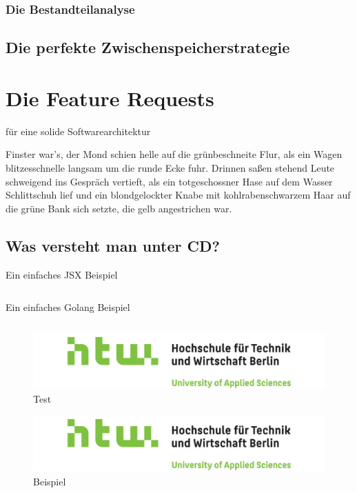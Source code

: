 \subsection{Die Bestandteilanalyse}

\section{Die perfekte Zwischenspeicherstrategie}

\chapter{Die Feature Requests}

für eine solide Softwarearchitektur

Finster war's, der Mond schien helle auf die grünbeschneite Flur, als
ein Wagen blitzesschnelle langsam um die runde Ecke fuhr. Drinnen
saßen stehend Leute schweigend ins Gespräch vertieft, als ein
totgeschossner Hase auf dem Wasser Schlittschuh lief und ein
blondgelockter Knabe mit kohlrabenschwarzem Haar auf die grüne Bank
sich setzte, die gelb angestrichen war.

\section{Was versteht man unter CD?}
\label{sec:was-versteht-man-unter-cd}

\noindent
\begin{minipage}{\linewidth}
    \begin{quellcode}
        \label{lst:HelloJSX}
        \caption{Ein einfaches JSX Beispiel}
        \inputminted{jsx}{snippets/examples/Welcome.jsx}
    \end{quellcode}
\end{minipage}

\noindent
\begin{minipage}{\linewidth}
    \begin{quellcode}
        \label{lst:Golang}
        \caption{Ein einfaches Golang Beispiel}
        \inputminted{go}{snippets/examples/hello.go}
    \end{quellcode}
\end{minipage}

\newpage

\begin{figure}
    \label{figure:test}
    \includegraphics[scale=0.2]{img/HTW}
    \caption{Test}
\end{figure}

\begin{figure}
    \label{figure:beispiel}
    \includegraphics[scale=0.2]{img/HTW}
    \caption{Beispiel}
\end{figure}
